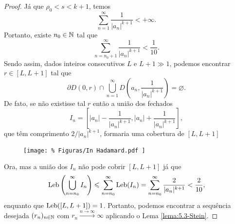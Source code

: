     \begin{proof}
        Já que $\rho_0 < s < k+1$, temos
        \begin{equation*}
            \sum_{n=1}^{\infty} \frac{1}{|a_n|^{k+1}} < +\infty.
        \end{equation*}
        Portanto, existe $n_0\in\mathbb{N}$ tal que
        \begin{equation*}
            \sum_{n = n_0 + 1}^{\infty} \frac{1}{|a_n|^{k+1}} < \frac{1}{10}.
        \end{equation*}
        Sendo assim, dados inteiros consecutivos $L$ e $L+1 \gg 1$, podemos
        encontrar $r\in [L, L+1]$ tal que
        \begin{equation*}
            \partial D(0, r) 
            \cap 
            \bigcup_{n=1}^{\infty} D\left( a_n, \frac{1}{|a_n|^{k+1}} \right)
            =
            \varnothing.
        \end{equation*}
        De fato, se não existisse tal $r$ então a união dos fechados
        \begin{equation*}
            I_n = 
            \left[
            |a_n| - \frac{1}{|a_n|^{k+1}}, |a_n| + \frac{1}{|a_n|^{k+1}}
            \right],
        \end{equation*}
        que têm comprimento $2/|a_n|^{k+1}$, formaria uma cobertura de $[L, L+1]$
        \begin{figure}[H]\centering
            \texttt{[image: \%
                Figuras/In Hadamard.pdf
            ]}
        \end{figure}
        Ora, mas a união dos $I_n$ não pode cobrir $[L, L+1]$ já que
        \begin{align*}
            \mathrm{Leb}\left(
            \bigcup_{n=n_0}^{\infty} I_n
            \right) 
            \leqslant
            \sum_{n=n_0}^{\infty} \mathrm{Leb}(I_n)
            =
            \sum_{n=n_0}^{\infty} \frac{2}{|a_n|^{k+1}}
            <
            \frac{2}{10},
        \end{align*}
        enquanto que $\mathrm{Leb}([L, L+1]) = 1$. Portanto, podemos encontrar 
        a sequência desejada $(r_n)_{n\in\mathbb{N}}$ com $r_n \xrightarrow{n\to\infty} \infty$
        aplicando o Lema \ref{lema:5.3-Stein}.
    \end{proof}
    
    \medskip
    
